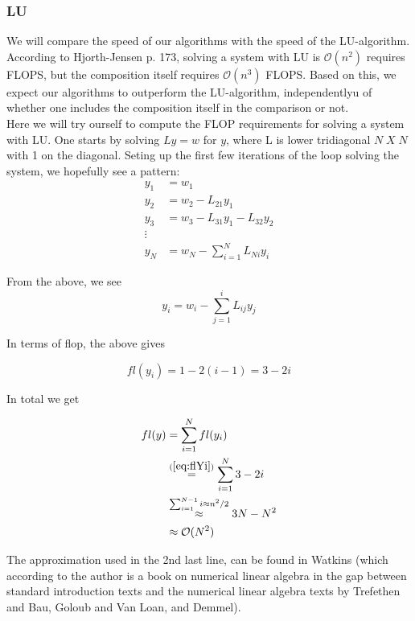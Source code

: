 \documentclass{article}
\begin{document}
\subsubsection{LU}
We will compare the speed of our algorithms with the speed of the LU-algorithm. According to Hjorth-Jensen \cite{MHJ} p. 173, solving a system with LU is $\mathcal{O}(n^2)$ requires FLOPS, but the composition itself requires  $\mathcal{O}(n^3)$ FLOPS. Based on this, we expect our algorithms to outperform the LU-algorithm, independentlyu of whether one includes the composition itself in the comparison or not.\\

Here we will try ourself to compute the FLOP requirements for solving a system with LU. One starts by solving $Ly = w$ for $y$, where L is lower tridiagonal $N\; X\; N$ with 1 on the diagonal. Seting up the first few iterations of the loop solving the system, we hopefully see a pattern:
\begin{align}
y_1 &= w_1\\
y_2 &= w_2 - L_{21} y_1\\
y_3 &= w_3 - L_{31} y_1 - L_{32}y_2\\
\vdots\\
y_{N}& = w_N - \sum_{i=1}^{N} L_{Ni} y_i
\end{align}

From the above, we see
\begin{equation}
y_i= w_i -\sum_{j=1}^{i}L_{ij}y_j
\end{equation}

In terms of flop, the above gives

\begin{equation}\label{eq:flYi}
fl(y_i) = 1 - 2(i - 1) = 3-2i
\end{equation}

In total we get

\begin{subequations}
	\begin{align}
	fl(y) &= \sum_{i=1}^{N} fl(y_i)\\
	&\stackrel{(\ref{eq:flYi})}{=} \sum_{i=1}^{N} 3 -2i\\
	&\stackrel{\sum_{i=1}^{N-1} i\approx n^2/2}{\approx}{3N - N^2  }\\
	&\approx \mathcal{O}(N^2)\label{eq:luForward}
	\end{align}
\end{subequations}

The approximation used in the 2nd last line, can be found in Watkins \cite{watkins} (which according to the author is a book on numerical linear algebra in the gap between standard introduction texts and the numerical linear algebra texts by Trefethen and Bau, Goloub and Van Loan, and Demmel).\\
\end{document}
